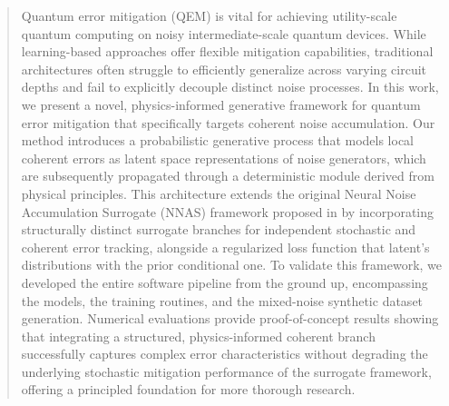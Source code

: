 \begin{abstract}
Quantum error mitigation (QEM) is vital for achieving utility-scale quantum computing on noisy intermediate-scale quantum devices. While learning-based approaches offer flexible mitigation capabilities, traditional architectures often struggle to efficiently generalize across varying circuit depths and fail to explicitly decouple distinct noise processes. In this work, we present a novel, physics-informed generative framework for quantum error mitigation that specifically targets coherent noise accumulation. Our method introduces a probabilistic generative process that models local coherent errors as latent space representations of noise generators, which are subsequently propagated through a deterministic module derived from physical principles. This architecture extends the original Neural Noise Accumulation Surrogate (NNAS) framework proposed in \cite{xu2025} by incorporating structurally distinct surrogate branches for independent stochastic and coherent error tracking, alongside a regularized loss function that latent's distributions with the prior conditional one. To validate this framework, we developed the entire software pipeline from the ground up, encompassing the models, the training routines, and the mixed-noise synthetic dataset generation. Numerical evaluations provide proof-of-concept results showing that integrating a structured, physics-informed coherent branch successfully captures complex error characteristics without degrading the underlying stochastic mitigation performance of the surrogate framework, offering a principled foundation for more thorough research.
\end{abstract}
